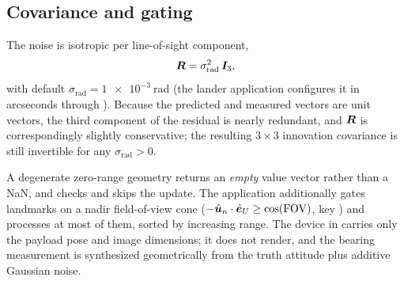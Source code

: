 \subsection{Covariance and gating}

The noise is isotropic per line-of-sight component,
\begin{equation}
  \bm{R} = \sigma_\mathrm{rad}^2\,\bm{I}_3 ,
  \label{eq:meas-crater-R}
\end{equation}
with default $\sigma_\mathrm{rad} = \SI{1e-3}{\radian}$ (the lander application
configures it in arcseconds through ). Because the
predicted and measured vectors are unit vectors, the third component of the
residual is nearly redundant, and $\bm{R}$ is correspondingly slightly
conservative; the resulting $3\times 3$ innovation covariance is still
invertible for any $\sigma_\mathrm{rad} > 0$.

A degenerate zero-range geometry returns an \emph{empty} value vector rather
than a NaN, and  checks
 and skips the update. The application additionally
gates landmarks on a nadir field-of-view cone
($-\hat{\bm{u}}_n\cdot\hat{\bm{e}}_U \ge \cos(\mathrm{FOV})$, key
) and processes at most
 of them, sorted by increasing range. The
 device in  carries only the
payload pose and image dimensions; it does not render, and the bearing
measurement is synthesized geometrically from the truth attitude plus additive
Gaussian noise.

